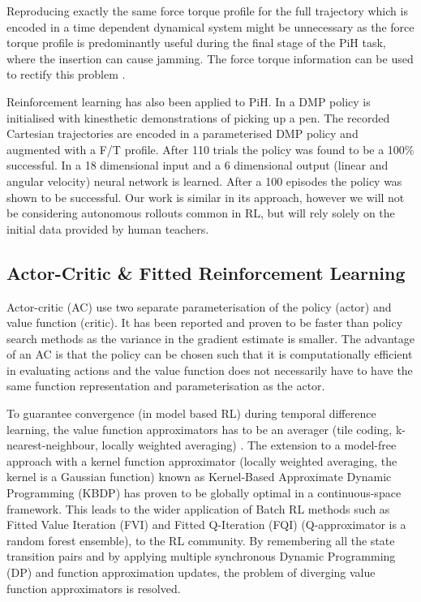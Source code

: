 \documentclass[final,3p,times,twocolumn]{elsarticle}
\begin{document}
Reproducing exactly the same force torque profile for the full trajectory which is encoded in a time dependent dynamical system might be 
unnecessary as the force torque profile is predominantly useful during the final stage of the PiH task, 
where the insertion can cause jamming. The force torque information can be used to rectify 
this problem \cite[Chap. 5]{Kronander2015}. 

Reinforcement learning has also been applied to PiH. In \cite{learn_force_c_icirs_2011} a DMP policy is 
initialised with kinesthetic demonstrations of picking up a pen. The recorded Cartesian 
trajectories are encoded in a parameterised DMP policy and augmented with a F/T profile. 
After 110 trials the policy was found to be a 100\% successful. In \cite{learn_admittance_icra_1994} a 18 dimensional input 
and a 6 dimensional output (linear and angular velocity) neural network is learned. After a 100 episodes the policy 
was shown to be successful. Our work is similar in its approach, however we will not be considering autonomous rollouts 
common in RL, but will rely solely on the initial data provided by human teachers.

\subsection{Actor-Critic \& Fitted Reinforcement Learning}

Actor-critic \cite[Chap. 6.6]{sutton98a} (AC) use two separate parameterisation of the policy (actor) and 
value function (critic). It has been reported and proven \cite{rl_ac_surv_2012} to be faster than policy 
search methods as the variance in the gradient estimate is smaller. The advantage of an AC is that 
the policy can be chosen such that it is computationally efficient in evaluating actions and the 
value function does not necessarily have to have the same function representation and parameterisation 
as the actor.

To guarantee convergence (in model based RL) during temporal difference learning, 
the value function approximators has to be an averager (tile coding, k-nearest-neighbour, locally weighted averaging) 
\cite{stable_FA_gordon_1995}. The extension to a model-free approach with a kernel function approximator 
(locally weighted averaging, the kernel is a Gaussian function) known as Kernel-Based Approximate Dynamic Programming (KBDP) \cite{kernel_rl_ormoneit_2002}
has proven to be globally optimal in a continuous-space framework. This leads to the wider application of Batch RL methods 
such as Fitted Value Iteration (FVI) \cite{fvi_uav_2010} and Fitted Q-Iteration (FQI) \cite{EGW05} (Q-approximator is a random forest ensemble),
\cite{fqi_nips_peter_2009} to the RL community. By remembering all the state transition pairs and by applying multiple 
synchronous Dynamic Programming (DP) and function approximation updates, the problem of diverging value function approximators is resolved. 
\end{document}
